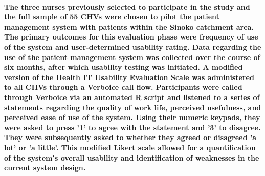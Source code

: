 \paragraph{The three nurses previously selected to participate in the study and the full sample of 55 CHVs were chosen to pilot the patient management system with patients within the Sinoko catchment area. The primary outcomes for this evaluation phase were frequency of use of the system and user-determined usability rating. Data regarding the use of the patient management system was collected over the course of six months, after which usability testing was initiated. A modified version of the Health IT Usability Evaluation Scale \citep{Yen2010} was administered to all CHVs through a Verboice call flow. Participants were called through Verboice via an automated R script and listened to a series of statements regarding the quality of work life, perceived usefulness, and perceived ease of use of the system. Using their numeric keypads, they were asked to press '1' to agree with the statement and '3' to disagree. They were subsequently asked to whether they agreed or disagreed 'a lot' or 'a little'. This modified Likert scale allowed for a quantification of the system's overall usability and identification of weaknesses in the current system design.}



